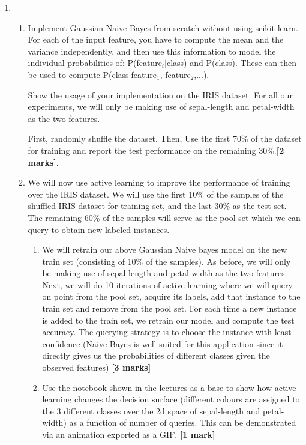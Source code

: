 \documentclass[colorlinks,linkcolor=true]{article}
\begin{document}
\begin{enumerate}


\item \begin{enumerate}
	
\item 	Implement Gaussian Naive Bayes from scratch without using scikit-learn. For each of the input feature, you have to compute the mean and the variance independently, and then use this information to model the individual probabilities of:
P(feature$_i|$class) and P(class). These can then be used to compute P(class$|$feature$_1$, feature$_2$,...). 

Show the usage of your implementation on the IRIS dataset. For all our experiments, we will only be making use of sepal-length and petal-width as the two features.

First, randomly shuffle the dataset. Then, Use the first 70\% of the dataset for training and report the test performance on the remaining 30\%.\textbf{[2 marks]}.

\item We will now use active learning to improve the performance of training over the IRIS dataset. We will use the first 10\% of the samples of the shuffled IRIS dataset for training set, and the last 30\% as the test set. The remaining 60\% of the samples will serve as the pool set which we can query to obtain new labeled instances.

\begin{enumerate}
	\item We will retrain our above Gaussian Naive bayes model on the new train set (consisting of 10\% of the samples). As before, we will only be making use of sepal-length and petal-width as the two features. Next, we will do 10 iterations of active learning where we will query on point from the pool set, acquire its labels, add that instance to the train set and remove from the pool set. For each time a new instance is added to the train set, we retrain our model and compute the test accuracy. The querying strategy is to choose the instance with least confidence (Naive Bayes is well suited for this application since it directly gives us the probabilities of different classes given the observed features) \textbf{[3 marks]}
	
	\item Use the \href{https://colab.research.google.com/github/nipunbatra/nipunbatra.github.io/blob/master/blog/2019/active-learning-motivation.ipynb}{notebook shown in the lectures} as a base to show how active learning changes the decision surface (different colours are assigned to the 3 different classes over the 2d space of sepal-length and petal-width) as a function of number of queries. This can be demonstrated via an animation exported as a GIF.  \textbf{[1 mark]}
	

\end{enumerate}
\end{enumerate}
\end{enumerate}
\end{document}
